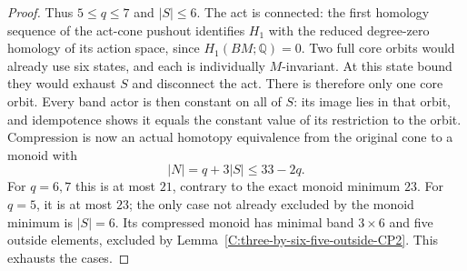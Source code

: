 \begin{proof}
Thus $5\leq q\leq7$ and $|S|\leq6$.  The act is connected:
the first homology sequence of the act-cone pushout identifies
$H_1$ with the reduced degree-zero homology of its action
space, since $H_1(BM;\mathbb Q)=0$.
Two full core orbits would already use six states, and each
is individually $M$-invariant.  At this state bound they would
exhaust $S$ and disconnect the act.  There is therefore only
one core orbit.  Every band actor is then constant on all of
$S$: its image lies in that orbit, and idempotence shows it
equals the constant value of its restriction to the orbit.
Compression is now an actual homotopy equivalence from the
original cone to a monoid with
\[
 |N|=q+3|S|\leq33-2q.
\]
For $q=6,7$ this is at most $21$, contrary to the exact
monoid minimum $23$.  For $q=5$, it is at most $23$;
the only case not already excluded by the monoid minimum is
$|S|=6$.  Its compressed monoid has minimal band $3\times6$
and five outside elements, excluded by
Lemma~\ref{C:three-by-six-five-outside-CP2}.
This exhausts the cases.
\end{proof}
